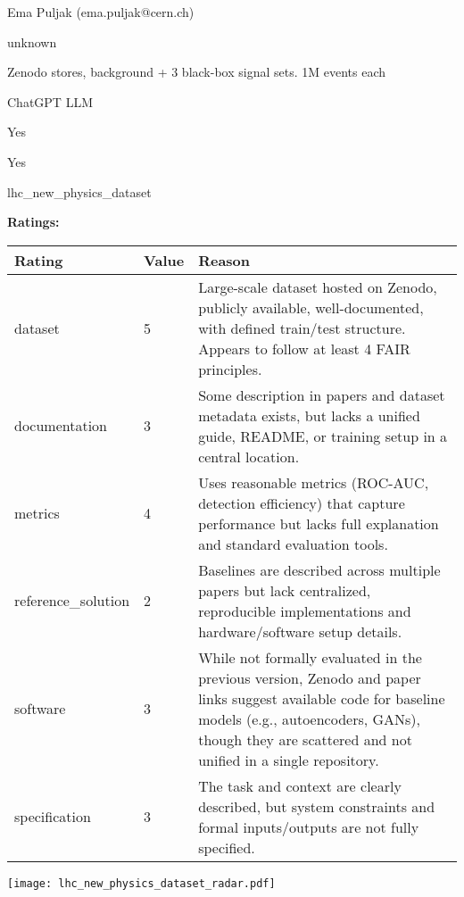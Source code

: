 {{\begin{description}[labelwidth=4cm, labelsep=1em, leftmargin=4cm, itemsep=0.1em, parsep=0em]
  \item[contact.name:] Ema Puljak (ema.puljak@cern.ch)
  \item[contact.email:] unknown
  \item[datasets.links.name:] Zenodo stores, background + 3 black-box signal sets. 1M events each
  \item[results.links.name:] ChatGPT LLM
  \item[fair.reproducible:] Yes
  \item[fair.benchmark\_ready:] Yes
  \item[id:] lhc\_new\_physics\_dataset
  \item[Citations:] \cite{https://doi.org/10.5281/zenodo.5046389}
\end{description}

{\bf Ratings:} ~ \\

\begin{tabular}{p{} p{} p{}}
\hline
Rating & Value & Reason \\
\hline
dataset & 5 & Large-scale dataset hosted on Zenodo, publicly available, well-documented, with defined train/test structure.
Appears to follow at least 4 FAIR principles.
 \\
documentation & 3 & Some description in papers and dataset metadata exists, but lacks a unified guide, README,
or training setup in a central location.
 \\
metrics & 4 & Uses reasonable metrics (ROC-AUC, detection efficiency) that capture performance but lacks
full explanation and standard evaluation tools.
 \\
reference\_solution & 2 & Baselines are described across multiple papers but lack centralized, reproducible implementations
and hardware/software setup details.
 \\
software & 3 & While not formally evaluated in the previous version, Zenodo and paper links suggest available code for baseline models
(e.g., autoencoders, GANs), though they are scattered and not unified in a single repository.
 \\
specification & 3 & The task and context are clearly described, but system constraints and formal inputs/outputs are not fully specified.
 \\
\hline
\end{tabular}

\texttt{[image: lhc\_new\_physics\_dataset\_radar.pdf]}
}}
\clearpage